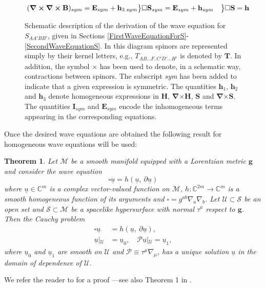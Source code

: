 \documentclass[10pt,a4paper]{article}
\theoremstyle{plain}
\newtheorem{theorem}{Theorem}
\def\bmg{{\bm g}}
\newenvironment{rcases}
  {\left.\begin{aligned}}
  {\end{aligned}\right\rbrace}
\begin{document}
\begin{figure}[h!]
\begin{equation*}
\begin{rcases}
\begin{rcases}
  (\bm\nabla\bm\times\bm\nabla \bm\times \mathbf{B})_{sym}=
  \mathbf{E}_{sym} + \mathbf{h}_{3\;sym}
\end{rcases}
&\square \mathbf{S}_{sym} =\mathbf{E}_{sym}+ \mathbf{h}_{sym}
\end{rcases}
\square\mathbf{S}=\mathbf{h}
\end{equation*}
\caption{ Schematic description of the derivation of the wave
  equation for $S_{AA'BB'}$, given in Sections
  \ref{FirstWaveEquationForS}-\ref{SecondWaveEquationS}.  In this
  diagram spinors are represented simply by their kernel letters, e.g., 
  $T_{AB...F,C'D'...H'}$ is denoted by $\mathbf{T}$.
 In addition, the symbol $\bm\times$ has been used
  to denote, in a schematic way, contractions between
  spinors.  The subscript \emph{sym} has been added to indicate that a
  given expression is symmetric. The quantities $\mathbf{h}_{1}$,
  $\mathbf{h}_{2}$ and $\mathbf{h}_{3}$ denote  homogeneous
  expressions in $\mathbf{H}$, $\bm\nabla
  \bm\times\mathbf{H}$, $\mathbf{S}$ and $\bm\nabla \bm\times
  \mathbf{S}$. The quantities $\mathbf{I}_{sym}$ and
  $\mathbf{E}_{sym}$ encode the inhomogeneous terms appearing in the
  corresponding equations.}
\label{fig:Schematic}
\end{figure}


Once the desired wave equations are obtained the following
result for homogeneous wave equations will be used:

\medskip

\begin{theorem}
\label{TheoremHomogeneousWave}
 Let $\mathcal{M}$ be a smooth manifold equipped with a 
Lorentzian metric $\bmg$ and consider the wave equation
\[\square \underline{u}=h\left(\underline{u},~\partial\underline{u}\right)\]
where $\underline{u}\in\mathbb{C}^m$ is a complex vector-valued function
on $\mathcal{M}$, 
$h:\mathbb{C}^{2m}\rightarrow\mathbb{C}^m$ is a smooth homogeneous
function of its arguments and $\square=g^{ab}\nabla_{a}\nabla_{b}$.
Let $\mathcal{U}\subset\mathcal{S}$ be an open set and $\mathcal{S}\subset \mathcal{M}$ be a spacelike hypersurface with normal
$\tau^{a}$ respect to $\bmg$. Then the Cauchy problem
\begin{align*}
\square
\underline{u}&=h\left(\underline{u},~\partial\underline{u}\right),\\ \underline{u}\left|_{\mathcal{U}}\right.&=\underline{u}_0,
\quad
\mathcal{P}\underline{u}\left|_{\mathcal{U}}\right.=\underline{u}_1,
\end{align*} 
where $\underline{u}_{0}$ and $\underline{u}_{1}$  are 
smooth on $\mathcal{U}$ and $\mathcal{P}\equiv \tau^\mu\nabla_\mu$,
 has a unique solution $\underline{u}$ in the domain of dependence of $\mathcal{U}$.
\end{theorem}
We refer the reader to
\cite{CFEbook,Tay96c} for a proof ---see also Theorem 1 in \cite{GarVal08c}.  
\end{document}
